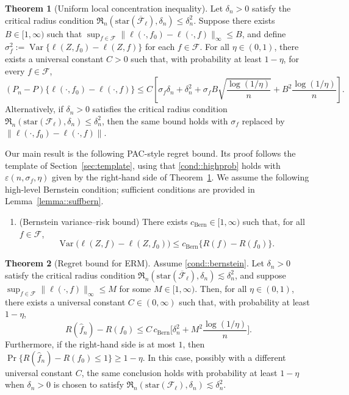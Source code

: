\documentclass[11pt]{article}
\theoremstyle{plain}
\theoremstyle{definition} %
\newtheorem{theorem}{Theorem}
\newcommand{\Var}{\operatorname{Var}}
\begin{document}
\begin{theorem}[Uniform local concentration inequality]
\label{theorem::localmaxloss}
Let $\delta_n>0$ satisfy the critical radius condition
$\mathfrak{R}_n(\mathrm{star}(\overline{\mathcal{F}}_{\ell}),\delta_n)\le \delta_n^2$.
Suppose there exists \(B \in [1,\infty)\) such that
\(\sup_{f \in \mathcal F}\|\ell(\cdot,f_0)-\ell(\cdot,f)\|_{\infty} \le B\),
and define \(\sigma_f^2 := \Var\{\ell(Z,f_0)-\ell(Z,f)\}\) for each
\(f \in \mathcal F\).
For all $\eta \in (0,1)$, there exists a universal constant $C>0$ such that, with probability at least $1-\eta$, for every $f\in\mathcal{F}$,
\[
(P_n-P) \{\ell(\cdot, f_0) - \ell(\cdot, f)\}
\le
C\left[
\sigma_f\delta_n
+
\delta_n^2
+
\sigma_f B  \sqrt{\frac{\log(1/\eta)}{n}}
+
B^2\frac{\log(1/\eta)}{n}
\right].
\]
Alternatively, if $\delta_n>0$ satisfies the critical radius condition
$\mathfrak{R}_n(\mathrm{star}(\mathcal{F}_{\ell}),\delta_n)\le \delta_n^2$, then the same bound holds with
$\sigma_f$ replaced by $\|\ell(\cdot, f_0) - \ell(\cdot, f)\|$.
\end{theorem}


Our main result is the following PAC-style regret bound. Its proof follows the template of Section~\ref{sec:template}, using that \ref{cond::highprob} holds with $\varepsilon(n,\sigma_f,\eta)$ given by the right-hand side of Theorem~\ref{theorem::localmaxloss}. We assume the following high-level Bernstein condition; sufficient conditions are provided in Lemma~\ref{lemma::suffbern}.

\begin{enumerate}[label=\bf{A\arabic*)}, ref={A\arabic*}, series = main]
  \item \label{cond::bernstein} (Bernstein variance--risk bound) There exists $c_{\mathrm{Bern}} \in [1,\infty)$ such that, for all $f\in\mathcal F$,
\begin{equation*}
\Var\bigl(\ell(Z,f)-\ell(Z,f_0)\bigr)\le c_{\mathrm{Bern}}\{R(f)-R(f_0)\}.
\end{equation*}
\end{enumerate}



\begin{theorem}[Regret bound for ERM]
\label{theorem:genregret}
Assume \ref{cond::bernstein}. Let \(\delta_n>0\) satisfy the critical radius condition
\(\mathfrak{R}_n(\mathrm{star}(\overline{\mathcal{F}}_{\ell}),\delta_n)\lesssim \delta_n^2\), and suppose
\(\sup_{f \in \mathcal{F}} \|\ell(\cdot, f)\|_{\infty} \leq M\) for some \(M \in [1, \infty)\).
Then, for all \(\eta \in (0, 1)\), there exists a universal constant
\(C\in(0,\infty)\) such that, with probability at least \(1-\eta\),
\[
R(\hat f_n)-R(f_0)
\le
C\,c_{\mathrm{Bern}}\Biggl[
\delta_n^2
+
M^2 \frac{\log(1/\eta)}{n}
\Biggr].
\]
Furthermore, if the right-hand side is at most \(1\), then
\(\Pr\{R(\hat f_n)-R(f_0)\le 1\}\ge 1-\eta\).
In this case, possibly with a different universal constant \(C\), the same conclusion holds
with probability at least \(1-\eta\) when \(\delta_n>0\) is chosen to satisfy
\(\mathfrak{R}_n(\mathrm{star}(\mathcal{F}_{\ell}),\delta_n)\lesssim \delta_n^2\).
\end{theorem}
\end{document}
